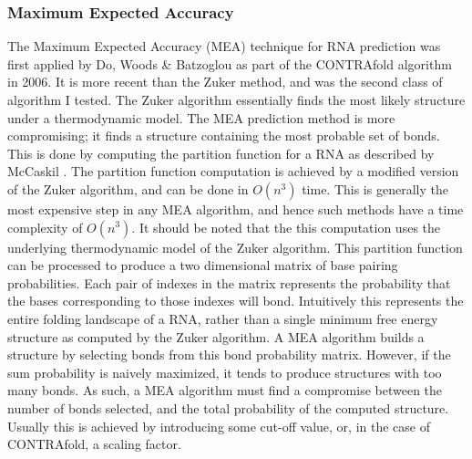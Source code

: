 \documentclass[12pt, a4paper]{article}
\begin{document}
\subsubsection{Maximum Expected Accuracy}
The Maximum Expected Accuracy (MEA) technique for RNA prediction was first applied by Do, Woods \& Batzoglou \cite{do2006contrafold} as part of the CONTRAfold algorithm in 2006. It is more recent than the Zuker method, and was the second class of algorithm I tested. The Zuker algorithm essentially finds the most likely structure under a thermodynamic model. The MEA prediction method is more compromising; it finds a structure containing the most probable set of bonds. This is done by computing the partition function for a RNA as described by McCaskil \cite{mccaskill1990equilibrium}. The partition function computation is achieved by a modified version of the Zuker algorithm, and can be done in $O(n^3)$ time. This is generally the most expensive step in any MEA algorithm, and hence such methods have a time complexity of $O(n^3)$. It should be noted that the this computation uses the underlying thermodynamic model of the Zuker algorithm. This partition function can be processed to produce a two dimensional matrix of base pairing probabilities. Each pair of indexes in the matrix represents the probability that the bases corresponding to those indexes will bond. Intuitively this represents the entire folding landscape of a RNA, rather than a single minimum free energy structure as computed by the Zuker algorithm. A MEA algorithm builds a structure by selecting bonds from this bond probability matrix. However, if the sum probability is naively maximized, it tends to produce structures with too many bonds. As such, a MEA algorithm must find a compromise between the number of bonds selected, and the total probability of the computed structure. Usually this is achieved by introducing some cut-off value, or, in the case of CONTRAfold, a scaling factor.
\end{document}
